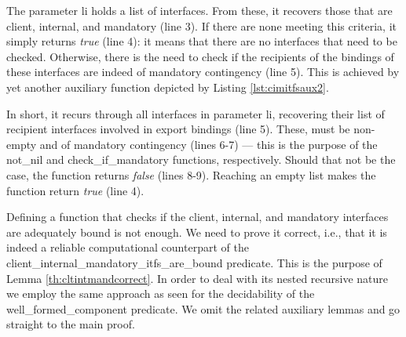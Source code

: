 	\noindent  The parameter \textsf{li} holds a list of \textsf{interface}s. From these, it recovers those
	that are \textsf{client}, \textsf{internal}, and \textsf{mandatory} (line 3). If there are none meeting
	this criteria,  it simply returns \textit{true} (line 4): it means that there are no \textsf{interface}s that need
	to be checked. Otherwise, there is the need to check if the recipients of the \textsf{binding}s of these \textsf{interface}s are indeed
	of \textsf{mandatory} contingency (line 5). This is achieved by yet another auxiliary function depicted by
	Listing \ref{lst:cimitfsaux2}.
	
	

	\noindent In short, it recurs through all \textsf{interface}s in parameter \textsf{li}, recovering
	their list of recipient \textsf{interface}s involved in \textsf{export} \textsf{binding}s (line 5). 
	These, must be non-empty and of \textsf{mandatory} \textsf{contingency} (lines 6-7) ---
	this is the purpose of the \textsf{not\_nil} and \textsf{check\_if\_mandatory} functions, respectively.
	Should that
	not be the case, the function returns \textit{false} (lines 8-9). Reaching an empty list makes the function
	return \textit{true} (line 4).
				
	
	Defining a function that checks if the \textsf{client}, \textsf{internal}, and \textsf{mandatory}
	\textsf{interface}s are adequately bound is not enough. We need to prove it correct, i.e., that it is
	indeed a reliable computational counterpart of the \textsf{client\_internal\_mandatory\_itfs\_are\_bound} 
	predicate. This is the purpose of Lemma	\ref{th:cltintmandcorrect}. In order to deal with its nested recursive
	nature we employ the same approach as seen for the decidability of the \textsf{well\_formed\_component} predicate.
	We omit the related auxiliary lemmas	and go straight to the main proof.		
	
